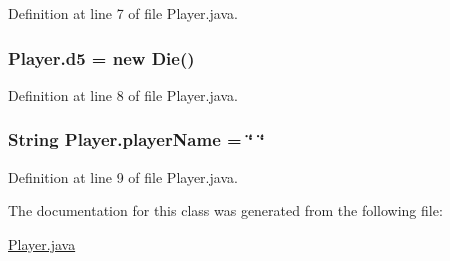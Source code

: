 Definition at line 7 of file Player.\-java.

\hypertarget{class_player_ae09435fbfcb1f6dc0d6e4e30ce5e7d03}{
\subsubsection[{d5}]{ Player.\-d5 = new {\bf Die}()\hspace{0.3cm}{\ttfamily [package]}}}\label{class_player_ae09435fbfcb1f6dc0d6e4e30ce5e7d03}


Definition at line 8 of file Player.\-java.

\hypertarget{class_player_ae4fda097bcc40683e9b140bbee10d403}{
\subsubsection[{player\-Name}]{\setlength{\rightskip}{0pt plus 5cm}String Player.\-player\-Name = \char`\"{} \char`\"{}\hspace{0.3cm}{\ttfamily [package]}}}\label{class_player_ae4fda097bcc40683e9b140bbee10d403}


Definition at line 9 of file Player.\-java.



The documentation for this class was generated from the following file\-:\begin{DoxyCompactItemize}
\item 
\hyperlink{_player_8java}{Player.\-java}\end{DoxyCompactItemize}
